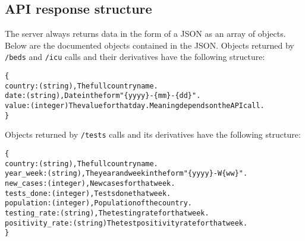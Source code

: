 \documentclass[pdftex, 11pt, a4paper]{article}
\newcommand{\code}{\texttt}
\begin{document}
    \subsection{API response structure} \label{sec:api_response}
    The server always returns data in the form of a JSON as an array of objects.
    Below are the documented objects contained in the JSON.\newline
    Objects returned by \code{/beds} and \code{/icu} calls and their derivatives
    have the following structure:
    \begin{alltt}
    \{
        country: (string),  The full country name.
        date: (string),     Date in the form "\{yyyy\}-\{mm\}-\{dd\}".
        value: (integer)    The value for that day. Meaning depends on the API call.
    \}
    \end{alltt}
    Objects returned by \code{/tests} calls and its derivatives
    have the following structure:
    \begin{alltt}
    \{
        country: (string),          The full country name.
        year_week: (string),        The year and week in the form "\{yyyy\}-W\{ww\}".
        new_cases: (integer),       New cases for that week.
        tests_done: (integer),      Tests done that week.
        population: (integer),      Population of the country.
        testing_rate: (string),     The testing rate for that week.
        positivity_rate: (string)   The test positivity rate for that week.
    \}
    \end{alltt}
\end{document}
